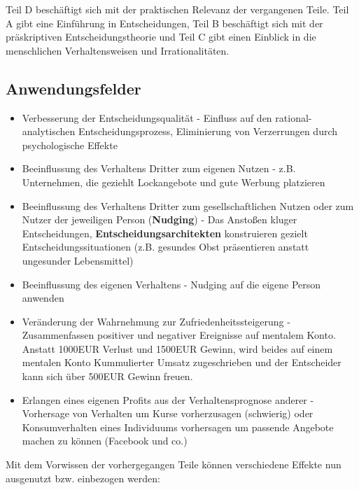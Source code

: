Teil D beschäftigt sich mit der praktischen Relevanz der vergangenen Teile.
Teil A gibt eine Einführung in Entscheidungen, Teil B beschäftigt sich mit
der präskriptiven Entscheidungstheorie und Teil C gibt einen Einblick in
die menschlichen Verhaltensweisen und Irrationalitäten.

\subsection{Anwendungsfelder}
\begin{itemize}
    \item Verbesserung der Entscheidungsqualität - Einfluss auf den
        rational-analytischen Entscheidungsprozess, Eliminierung von
        Verzerrungen durch psychologische Effekte
    \item Beeinflussung des Verhaltens Dritter zum eigenen Nutzen - z.B.
        Unternehmen, die geziehlt Lockangebote und gute Werbung platzieren
    \item Beeinflussung des Verhaltens Dritter zum gesellschaftlichen Nutzen
        oder zum Nutzer der jeweiligen Person (\textbf{Nudging}) - Das Anstoßen
        kluger Entscheidungen, \textbf{Entscheidungsarchitekten} konstruieren
        gezielt Entscheidungssituationen (z.B. gesundes Obst präsentieren
        anstatt ungesunder Lebensmittel)
    \item Beeinflussung des eigenen Verhaltens -
        Nudging auf die eigene Person anwenden
    \item Veränderung der Wahrnehmung zur Zufriedenheitssteigerung
        - Zusammenfassen positiver und negativer Ereignisse auf mentalem Konto.
        Anstatt 1000EUR Verlust und 1500EUR Gewinn, wird beides auf einem
        mentalen Konto Kummulierter Umsatz zugeschrieben und der
        Entscheider kann sich über 500EUR Gewinn freuen.
    \item Erlangen eines eigenen Profits aus der Verhaltensprognose anderer -
        Vorhersage von Verhalten um Kurse vorherzusagen (schwierig) oder
        Konsumverhalten eines Individuums vorhersagen um passende Angebote
        machen zu können (Facebook und co.)
\end{itemize}
Mit dem Vorwissen der vorhergegangen Teile können verschiedene Effekte nun
ausgenutzt bzw. einbezogen werden:

